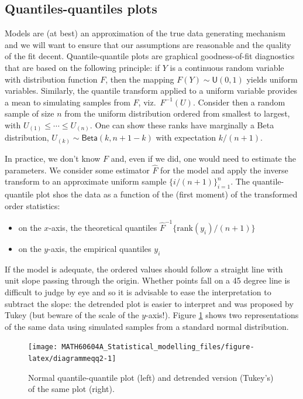 \documentclass[
  11pt,
  letterpaper,
]{book}
\providecommand{\tightlist}{%
  \setlength{\itemsep}{0pt}\setlength{\parskip}{0pt}}
\theoremstyle{definition}
\theoremstyle{definition}
\theoremstyle{definition}
\theoremstyle{remark}
\begin{document}
\hypertarget{diagramme-qq}{%
\subsection{Quantiles-quantiles plots}\label{diagramme-qq}}

Models are (at best) an approximation of the true data generating mechanism and we will want to ensure that our assumptions are reasonable and the quality of the fit decent. Quantile-quantile plots are graphical goodness-of-fit diagnostics that are based on the following principle: if \(Y\) is a continuous random variable with distribution function \(F\), then the mapping \(F(Y) \sim \mathsf{U}(0,1)\) yields uniform variables. Similarly, the quantile transform applied to a uniform variable provides a mean to simulating samples from \(F\), viz.~\(F^{-1}(U)\). Consider then a random sample of size \(n\) from the uniform distribution ordered from smallest to largest, with \(U_{(1)} \leq \cdots \leq U_{(n)}\). One can show these ranks have marginally a Beta distribution, \(U_{(k)} \sim \mathsf{Beta}(k, n+1-k)\) with expectation \(k/(n+1)\).

In practice, we don't know \(F\) and, even if we did, one would need to estimate the parameters. We consider some estimator \(\widehat{F}\) for the model and apply the inverse transform to an approximate uniform sample \(\{i/(n+1)\}_{i=1}^n\). The quantile-quantile plot shos the data as a function of the (first moment) of the transformed order statistics:

\begin{itemize}
\tightlist
\item
  on the \(x\)-axis, the theoretical quantiles \(\widehat{F}^{-1}\{\mathrm{rank}(y_i)/(n+1)\}\)
\item
  on the \(y\)-axis, the empirical quantiles \(y_i\)
\end{itemize}

If the model is adequate, the ordered values should follow a straight line with unit slope passing through the origin. Whether points fall on a 45 degree line is difficult to judge by eye and so it is advisable to ease the interpretation to subtract the slope: the detrended plot is easier to interpret and was proposed by Tukey (but beware of the scale of the \(y\)-axis!). Figure \ref{fig:diagrammeqq2} shows two representations of the same data using simulated samples from a standard normal distribution.

\begin{figure}

{\centering \texttt{[image: MATH60604A\_Statistical\_modelling\_files/figure-latex/diagrammeqq2-1]} 

}

\caption{Normal quantile-quantile plot (left) and detrended version (Tukey's) of the same plot (right).}\label{fig:diagrammeqq2}
\end{figure}
\end{document}
